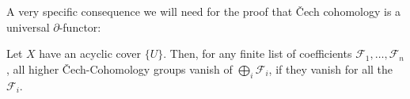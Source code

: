 A very specific consequence we will need for the proof that \v{C}ech cohomology is a universal $\partial$-functor:

\begin{corollary}%
  \label{chech-coefficient-sum}
  Let $X$ have an acyclic cover $\{U\}$.
  Then, for any finite list of coefficients $\mathcal F_1,\dots,\mathcal F_n$,
  all higher \v{C}ech-Cohomology groups vanish of $\bigoplus_{i}\mathcal F_i$,
  if they vanish for all the $\mathcal F_i$.
\end{corollary}
